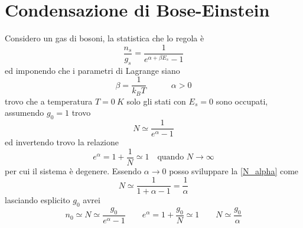 

\section{Condensazione di Bose-Einstein}
Considero un gas di bosoni, la statistica che lo regola è 
\begin{equation}
\frac{n_s}{g_s} = \frac{1}{e^{ \alpha + \beta E_s } - 1}
\end{equation}
ed imponendo che i parametri di Lagrange siano
\begin{equation}
\beta = \frac{1}{k_B T} \quad\quad\quad \alpha > 0
\end{equation}
trovo che a temperatura $T = \SI{0}{K}$ solo gli stati con $E_s = 0$ sono occupati, assumendo $g_0  = 1$ trovo
\begin{equation}
N \simeq \frac{ 1}{e^{ \alpha } - 1 }
\label{N_alpha}
\end{equation}
ed invertendo trovo la relazione
\begin{equation}
e^{\alpha} = 1 + \frac{1}{N} \simeq 1 \quad \mbox{quando } N \to \infty
\end{equation}
per cui il sistema è degenere.
Essendo $\alpha \to 0$ posso sviluppare la \ref{N_alpha} come
\begin{equation}
N \simeq \frac{1}{1+ \alpha - 1} = \frac{1}{\alpha}
\end{equation}
lasciando esplicito $g_0$ avrei
\begin{equation}
n_0 \simeq N \simeq \frac{g_0}{e^{ \alpha } - 1 }
\quad\quad
e^{\alpha} = 1 + \frac{g_0}{N} \simeq 1
\quad\quad
N \simeq \frac{g_0}{\alpha}
\end{equation}

